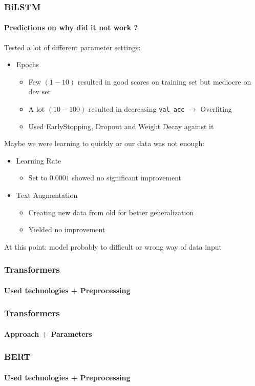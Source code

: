 \documentclass[english,handout]{mlutalk}
\begin{document}
\begin{frame}
  \frametitle{BiLSTM}
  \framesubtitle{Predictions on why did it not work ?}
    
  Tested a lot of different parameter settings:
  \begin{itemize}
    \item Epochs
    \begin{itemize}
      \item Few $(1-10)$ resulted in good scores on training set but mediocre on dev set
      \item A lot $(10-100)$ resulted in decreasing \texttt{val\_acc} $\rightarrow$ Overfiting
      \item Used EarlyStopping, Dropout and Weight Decay against it
    \end{itemize}
  \end{itemize}
  Maybe we were learning to quickly or our data was not enough:
  \begin{itemize}
    \item Learning Rate 
    \begin{itemize}
      \item Set to $0.0001$ showed no significant improvement
    \end{itemize}
    \item Text Augmentation
    \begin{itemize}
      \item Creating new data from old for better generalization
      \item Yielded no improvement
    \end{itemize}
  \end{itemize}

  At this point: model probably to difficult or wrong way of data input

\end{frame}

\begin{frame}
  \frametitle{Transformers}
  \framesubtitle{Used technologies + Preprocessing}
  

\end{frame}

\begin{frame}
  \frametitle{Transformers}
  \framesubtitle{Approach + Parameters}
  

\end{frame}

\begin{frame}
  \frametitle{BERT}
  \framesubtitle{Used technologies + Preprocessing}
  

\end{frame}
\end{document}
